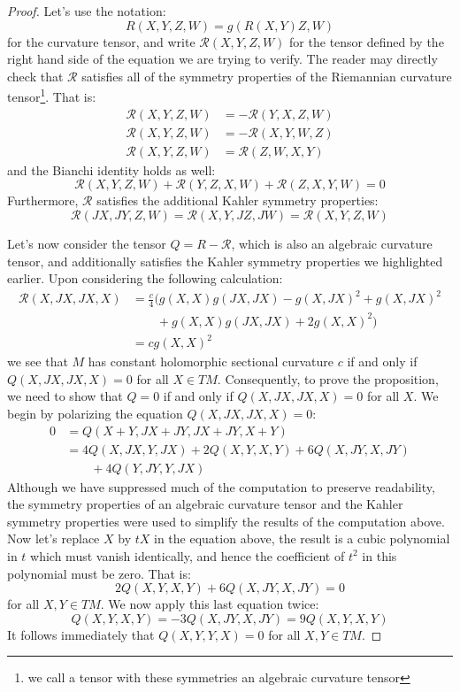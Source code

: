 \documentclass[11pt]{amsart}
\theoremstyle{definition}
\def \Rcurv{ \mathcal{R} }
\begin{document}
\begin{proof}
%
Let's use the notation:
%
$$ R(X,Y,Z,W) = g( R(X,Y)Z, W ) $$
%
for the curvature tensor, and write $\Rcurv (X,Y,Z,W)$ for the tensor defined by the right hand side of the equation we are trying to verify.  The reader may directly check that $\Rcurv$ satisfies all of the symmetry properties of the Riemannian curvature tensor\footnote{we call a tensor with these symmetries an algebraic curvature tensor}.  That is:
%
\begin{align*}
\Rcurv (X,Y,Z,W) &= - \Rcurv (Y,X,Z,W) \\
\Rcurv (X,Y,Z,W) &= - \Rcurv (X,Y,W,Z) \\
\Rcurv (X,Y,Z,W) &= \Rcurv(Z,W,X,Y)
\end{align*}
%
and the Bianchi identity holds as well:
$$ \Rcurv (X,Y,Z,W) + \Rcurv (Y,Z,X,W) + \Rcurv (Z,X,Y,W) = 0 $$
%
Furthermore, $\Rcurv$ satisfies the additional Kahler symmetry properties:
%
$$ \Rcurv( JX, JY, Z, W ) = \Rcurv ( X, Y, JZ, JW ) = \Rcurv ( X,Y,Z,W ) $$

Let's now consider the tensor $Q = R - \Rcurv$, which is also an algebraic curvature tensor, and additionally satisfies the Kahler symmetry properties we highlighted earlier.  Upon considering the following calculation:
%
\begin{align*}
\Rcurv (X, JX, JX, X) &= \frac{c}{4} ( g(X,X)g(JX,JX) - g(X,JX)^2 + g(X, JX)^2 \\
& \qquad + g(X,X)g(JX,JX) + 2 g(X,X)^2 ) \\
&= c g(X,X)^2
\end{align*}
%
we see that $M$ has constant holomorphic sectional curvature $c$ if and only if $Q(X,JX,JX,X) = 0$ for all $X \in TM$.  Consequently, to prove the proposition, we need to show that $Q=0$ if and only if $Q(X,JX,JX,X) = 0$ for all $X$.
%
We begin by polarizing the equation $Q(X,JX,JX,X) = 0$:
%
\begin{align*}
0 &= Q ( X + Y, JX + JY, JX + JY, X + Y ) \\
&= 4 Q (X, JX, Y, JX ) +  2 Q (X,Y,X,Y) + 6 Q (X, JY, X, JY) \\
& \qquad + 4 Q ( Y, JY, Y, JX )
\end{align*}
%
Although we have suppressed much of the computation to preserve readability, the symmetry properties of an algebraic curvature tensor and the Kahler symmetry properties were used to simplify the results of the computation above.  Now let's replace $X$ by $tX$ in the equation above, the result is a cubic polynomial in $t$ which must vanish identically, and hence the coefficient of $t^2$ in this polynomial must be zero.  That is:
%
$$2 Q(X,Y,X,Y) + 6 Q(X, JY, X, JY) = 0 $$
%
for all $X,Y \in TM$.  We now apply this last equation twice:
%
$$ Q(X,Y,X,Y) = - 3 Q(X,JY,X,JY) = 9 Q(X, Y, X, Y) $$
%
It follows immediately that $Q(X,Y,Y,X) = 0$ for all $X,Y \in TM$.  


\end{proof}
\end{document}
